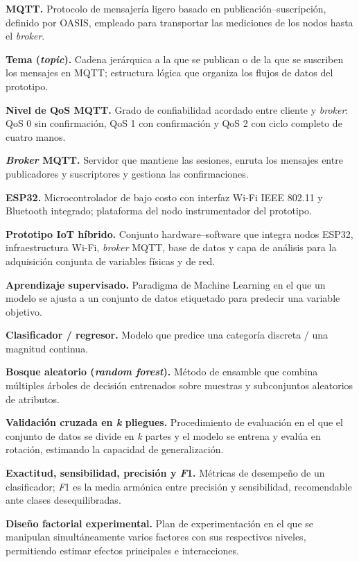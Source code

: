 \documentclass[
  12pt,
]{article}
\begin{document}
\textbf{MQTT.} Protocolo de mensajería ligero basado en
publicación–suscripción, definido por OASIS, empleado para transportar
las mediciones de los nodos hasta el \emph{broker}.

\textbf{Tema (\emph{topic}).} Cadena jerárquica a la que se publican o
de la que se suscriben los mensajes en MQTT; estructura lógica que
organiza los flujos de datos del prototipo.

\textbf{Nivel de QoS MQTT.} Grado de confiabilidad acordado entre
cliente y \emph{broker}: QoS 0 sin confirmación, QoS 1 con confirmación
y QoS 2 con ciclo completo de cuatro manos.

\textbf{\emph{Broker} MQTT.} Servidor que mantiene las sesiones, enruta
los mensajes entre publicadores y suscriptores y gestiona las
confirmaciones.

\textbf{ESP32.} Microcontrolador de bajo costo con interfaz Wi-Fi IEEE
802.11 y Bluetooth integrado; plataforma del nodo instrumentador del
prototipo.

\textbf{Prototipo IoT híbrido.} Conjunto hardware–software que integra
nodos ESP32, infraestructura Wi-Fi, \emph{broker} MQTT, base de datos y
capa de análisis para la adquisición conjunta de variables físicas y de
red.

\textbf{Aprendizaje supervisado.} Paradigma de Machine Learning en el
que un modelo se ajusta a un conjunto de datos etiquetado para predecir
una variable objetivo.

\textbf{Clasificador / regresor.} Modelo que predice una categoría
discreta / una magnitud continua.

\textbf{Bosque aleatorio (\emph{random forest}).} Método de ensamble que
combina múltiples árboles de decisión entrenados sobre muestras y
subconjuntos aleatorios de atributos.

\textbf{Validación cruzada en \emph{k} pliegues.} Procedimiento de
evaluación en el que el conjunto de datos se divide en \emph{k} partes y
el modelo se entrena y evalúa en rotación, estimando la capacidad de
generalización.

\textbf{Exactitud, sensibilidad, precisión y \emph{F}1.} Métricas de
desempeño de un clasificador; \emph{F}1 es la media armónica entre
precisión y sensibilidad, recomendable ante clases desequilibradas.

\textbf{Diseño factorial experimental.} Plan de experimentación en el
que se manipulan simultáneamente varios factores con sus respectivos
niveles, permitiendo estimar efectos principales e interacciones.
\end{document}

